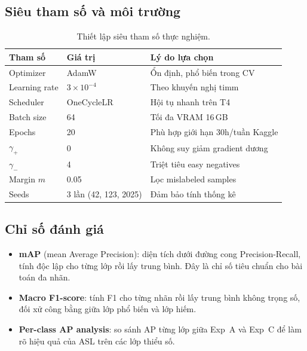 \documentclass{article}
\begin{document}
\subsection{Siêu tham số và môi trường}

\begin{table}[H]
  \caption{Thiết lập siêu tham số thực nghiệm.}
  \label{tab:hparam}
  \centering
  \begin{tabular}{lll}
    \toprule
    \textbf{Tham số} & \textbf{Giá trị} & \textbf{Lý do lựa chọn} \\
    \midrule
    Optimizer       & AdamW                        & Ổn định, phổ biến trong CV \\
    Learning rate   & $3 \times 10^{-4}$           & Theo khuyến nghị timm \\
    Scheduler       & OneCycleLR                   & Hội tụ nhanh trên T4 \\
    Batch size      & 64                           & Tối đa VRAM 16\,GB \\
    Epochs          & 20                           & Phù hợp giới hạn 30h/tuần Kaggle \\
    $\gamma_{+}$    & 0                            & Không suy giảm gradient dương \\
    $\gamma_{-}$    & 4                            & Triệt tiêu easy negatives \\
    Margin $m$      & 0.05                         & Lọc mislabeled samples \\
    Seeds           & 3 lần (42, 123, 2025)        & Đảm bảo tính thống kê \\
    \bottomrule
  \end{tabular}
\end{table}

\subsection{Chỉ số đánh giá}

\begin{itemize}[leftmargin=1.8em]
  \item \textbf{mAP} (mean Average Precision): diện tích dưới đường cong
        Precision-Recall, tính độc lập cho từng lớp rồi lấy trung bình.
        Đây là chỉ số tiêu chuẩn cho bài toán đa nhãn.
  \item \textbf{Macro F1-score}: tính F1 cho từng nhãn rồi lấy trung bình
        không trọng số, đối xử công bằng giữa lớp phổ biến và lớp hiếm.
  \item \textbf{Per-class AP analysis}: so sánh AP từng lớp giữa Exp~A và
        Exp~C để làm rõ hiệu quả của ASL trên các lớp thiểu số.
\end{itemize}
\end{document}
